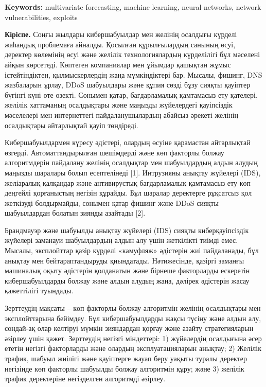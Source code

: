{\bfseries Keywords:} multivariate forecasting, machine learning, neural
networks, network vulnerabilities, exploits

\begin{multicols}{2}
{\bfseries Кіріспе.} Соңғы жылдары кибершабуылдар мен желінің осалдығы
күрделі жаһандық проблемаға айналды. Қосылған құрылғылардың санының
өсуі, деректер көлемінің өсуі және желілік технологиялардың күрделілігі
бұл мәселені айқын көрсетеді. Көптеген компаниялар мен ұйымдар қашықтан
жұмыс істейтіндіктен, қылмыскерлердің жаңа мүмкіндіктері бар. Мысалы,
фишинг, DNS жазбаларын ұрлау, DDoS шабуылдары және құпия сөзді бұзу
сияқты қауіптер бүгінгі күні өте өзекті. Сонымен қатар, бағдарламалық
қамтамасыз ету қателері, желілік хаттаманың осалдықтары және маңызды
жүйелердегі қауіпсіздік мәселелері мен интернеттегі пайдаланушылардың
абайсыз әрекеті желінің осалдықтары айтарлықтай қауіп төндіреді.

Кибершабуылдармен күресу әдістері, олардың өсуіне қарамастан айтарлықтай
өзгерді. Автоматтандырылған шешімдерді және көп факторлы болжау
алгоритмдерін пайдалану желінің осалдықтар мен шабуылдардың алдын алудың
маңызды шаралары болып есептелінеді {[}1{]}. Интрузияны анықтау жүйелері
(IDS), желіаралық қалқандар және антивирустық бағдарламалық қамтамасыз
ету көп деңгейлі қорғаныстың негізін құрайды. Бұл шаралар деректерге
рұқсатсыз қол жеткізуді болдырмайды, сонымен қатар фишинг және DDoS
сияқты шабуылдардан болатын зиянды азайтады {[}2{]}.

Брандмауэр және шабуылды анықтау жүйелері (IDS) сияқты киберқауіпсіздік
жүйелері заманауи шабуылдардың алдын алу үшін жеткілікті тиімді емес.
Мысалы, эксплойттар қазір күрделі «камуфляж» әдістерін жиі пайдаланады,
бұл анықтау мен бейтараптандыруды қиындатады. Нәтижесінде, қазіргі
заманғы машиналық оқыту әдістерін қолданатын және бірнеше факторларды
ескеретін кибершабуылдарды болжау және алдын алудың жаңа, дәлірек
әдістерін жасау қажеттілігі туындады.

Зерттеудің мақсаты -- көп факторлы болжау алгоритмін желінің осалдықтары
мен эксплойттарына бейімдеу. Бұл кибершабуылдарды жақсы түсіну және
алдын алу, сондай-ақ олар келтіруі мүмкін зияндардан қорғау және азайту
стратегияларын әзірлеу үшін қажет. Зерттеудің негізгі міндеттері: 1)
жүйелердің осалдығына әсер ететін негізгі факторларды және олардың
эксплуатацияларын анықтау; 2) Желілік трафик, шабуыл жиілігі және
қауіптерге жауап беру уақыты туралы деректер негізінде көп факторлы
шабуылды болжау алгоритмін құру; және 3) желілік трафик деректеріне
негізделген алгоритмді әзірлеу.


\end{multicols}
